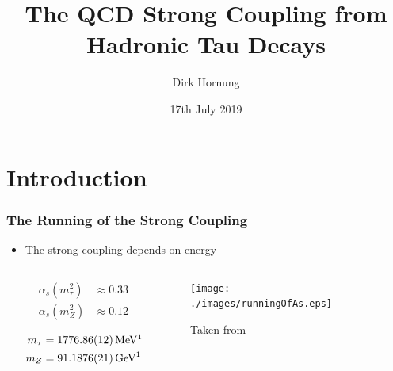 \documentclass{beamer}
\title[The Strong Coupling]{The QCD Strong Coupling from Hadronic Tau Decays}
\author{\Large Dirk Hornung}
\institute{
  \normalsize
  \textsc{Supervisor} \\
  Matthias Jamin
}
\date{17th July 2019}
\begin{document}
\frame{\titlepage}

\section{Introduction}
\begin{frame}
  \frametitle{The Running of the Strong Coupling}
  \begin{itemize}
  \item The strong coupling depends on energy
    \begin{columns}
      \begin{column}{0.35\textwidth}
        \begin{equation}
          \begin{split}
            \alpha_s(m_\tau^2) &\approx 0.33 \\
            \alpha_s(m_Z^2) &\approx  0.12
          \end{split}
        \end{equation}
        \begin{footnotesize}
          \begin{equation}
            \begin{split}
              m_\tau &= \SI{1776.86 \pm 0.12}{\mega\eV}\footnotemark \\
              m_Z &= \SI{91.1876 \pm 0.0021}{\giga\eV}^1
            \end{split}
          \end{equation}
        \end{footnotesize}
      \end{column}
      \begin{column}{0.65\textwidth}
        \begin{figure}
          \vspace{0.5cm}
          \texttt{[image: ./images/runningOfAs.eps]}\\[-1ex]
          \captionsetup{format=hang}
          \caption{\tiny Taken from \cite{PDG2018}}
        \end{figure}
      \end{column}
    \end{columns}
  \end{itemize}
\end{frame}
\end{document}
